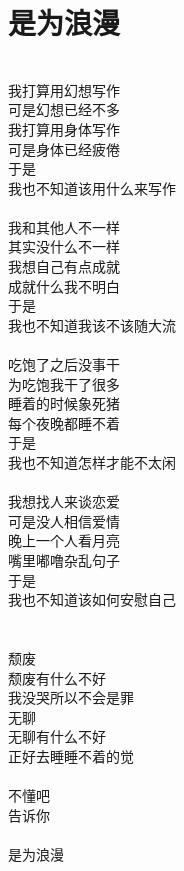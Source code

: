 \chapter{是为浪漫}

\leftskip=30mm

\noindent \\
我打算用幻想写作\\
可是幻想已经不多\\
我打算用身体写作\\
可是身体已经疲倦\\
于是\\
我也不知道该用什么来写作\\
\\
我和其他人不一样\\
其实没什么不一样\\
我想自己有点成就\\
成就什么我不明白\\
于是\\
我也不知道我该不该随大流\\
\\
吃饱了之后没事干\\
为吃饱我干了很多\\
睡着的时候象死猪\\
每个夜晚都睡不着\\
于是\\
我也不知道怎样才能不太闲\\
\\
我想找人来谈恋爱\\
可是没人相信爱情\\
晚上一个人看月亮\\
嘴里嘟噜杂乱句子\\
于是\\
我也不知道该如何安慰自己\\
\\
\\
颓废\\
颓废有什么不好\\
我没哭所以不会是罪\\
无聊\\
无聊有什么不好\\
正好去睡睡不着的觉\\
\\
不懂吧\\
告诉你\\
\\
是为浪漫
